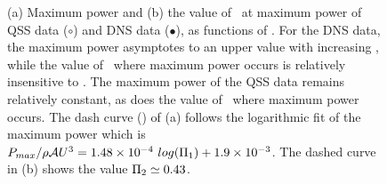 \begin{figure}
    \caption{(a) Maximum power and (b) the value of \massdamp\ at
      maximum power of QSS data ($\circ$) and DNS data ($\bullet$), as
      functions of \massstiff.  For the DNS data, the maximum power
      asymptotes to an upper value with increasing \massstiff, while
      the value of \massdamp\ where maximum power occurs is relatively
      insensitive to \massstiff. The maximum power of the QSS data
      remains relatively constant, as does the value of \massdamp\
      where maximum power occurs. The dash curve (\protect\dashedrule)
      of (a) follows the logarithmic fit of the maximum power which is
      $P_{max}/\rho \mathcal{A}U^3 =1.48 \times 10^{-4} \
      log(\Pi_1) + 1.9 \times 10^{-3} $. The dashed curve in (b)
      shows the value $\Pi_2\simeq 0.43$.}

    \label{fig:max_power}
\end{figure}

